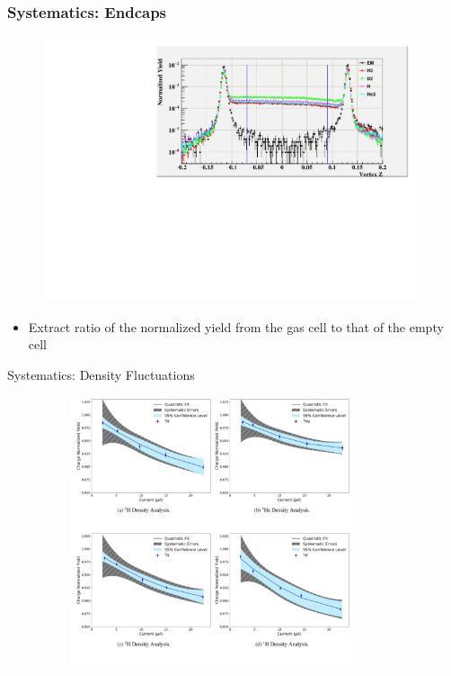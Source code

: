 \documentclass[12pt]{beamer}
\begin{document}
\begin{frame}
\frametitle{Systematics: Endcaps}
	\vspace{-15pt}
\begin{block}{}
	\begin{figure}
		\includegraphics[width=11.0cm]{../images/endcap_kin4.pdf}
	\end{figure}

\begin{itemize}
	\item Extract ratio of the normalized yield from the gas cell to that of the empty cell
\end{itemize}

\end{block}
\end{frame}

\begin{frame}{Systematics: Density Fluctuations}
	\vspace{-25pt}
	\begin{figure}
		\includegraphics[width=10cm,height=8.0cm]{../images/density_cor.pdf}
		\vspace{-0.5cm}
		\caption*{\cite{denscor}}
	\end{figure}

\end{frame}
\end{document}
